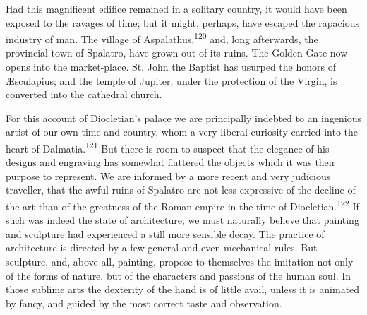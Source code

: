 

Had this magnificent edifice remained in a solitary country, it
would have been exposed to the ravages of time; but it might,
perhaps, have escaped the rapacious industry of man. The village
of Aspalathus,\textsuperscript{120} and, long afterwards, the provincial town of
Spalatro, have grown out of its ruins. The Golden Gate now opens
into the market-place. St. John the Baptist has usurped the
honors of Æsculapius; and the temple of Jupiter, under the
protection of the Virgin, is converted into the cathedral church.

For this account of Diocletian’s palace we are principally
indebted to an ingenious artist of our own time and country, whom
a very liberal curiosity carried into the heart of Dalmatia.\textsuperscript{121}
But there is room to suspect that the elegance of his designs and
engraving has somewhat flattered the objects which it was their
purpose to represent. We are informed by a more recent and very
judicious traveller, that the awful ruins of Spalatro are not
less expressive of the decline of the art than of the greatness
of the Roman empire in the time of Diocletian.\textsuperscript{122} If such was
indeed the state of architecture, we must naturally believe that
painting and sculpture had experienced a still more sensible
decay. The practice of architecture is directed by a few general
and even mechanical rules. But sculpture, and, above all,
painting, propose to themselves the imitation not only of the
forms of nature, but of the characters and passions of the human
soul. In those sublime arts the dexterity of the hand is of
little avail, unless it is animated by fancy, and guided by the
most correct taste and observation.




